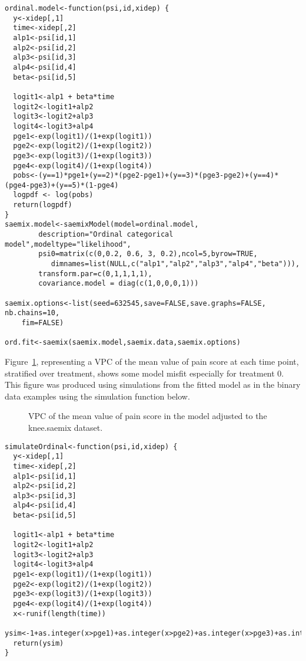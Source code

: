 \begin{verbatim}
ordinal.model<-function(psi,id,xidep) {
  y<-xidep[,1]
  time<-xidep[,2]
  alp1<-psi[id,1]
  alp2<-psi[id,2]
  alp3<-psi[id,3]
  alp4<-psi[id,4]
  beta<-psi[id,5]
  
  logit1<-alp1 + beta*time
  logit2<-logit1+alp2
  logit3<-logit2+alp3
  logit4<-logit3+alp4
  pge1<-exp(logit1)/(1+exp(logit1))
  pge2<-exp(logit2)/(1+exp(logit2))
  pge3<-exp(logit3)/(1+exp(logit3))
  pge4<-exp(logit4)/(1+exp(logit4))
  pobs<-(y==1)*pge1+(y==2)*(pge2-pge1)+(y==3)*(pge3-pge2)+(y==4)*(pge4-pge3)+(y==5)*(1-pge4)
  logpdf <- log(pobs)  
  return(logpdf)
}  
saemix.model<-saemixModel(model=ordinal.model,
        description="Ordinal categorical model",modeltype="likelihood",
        psi0=matrix(c(0,0.2, 0.6, 3, 0.2),ncol=5,byrow=TRUE,
           dimnames=list(NULL,c("alp1","alp2","alp3","alp4","beta"))),
        transform.par=c(0,1,1,1,1),
        covariance.model = diag(c(1,0,0,0,1)))

saemix.options<-list(seed=632545,save=FALSE,save.graphs=FALSE, nb.chains=10, 
    fim=FALSE)

ord.fit<-saemix(saemix.model,saemix.data,saemix.options)
\end{verbatim}

Figure~\ref{fig:kneeMedScoreVPC}, representing a VPC of the mean value of pain score at each time point, stratified over treatment, shows some model misfit especially for treatment 0. This figure was produced using simulations from the fitted model as in the binary data examples using the simulation function below.
\begin{figure}[!h]
\begin{center}
\end{center}
\par \kern -0.5cm
\caption{VPC of the mean value of pain score in the model adjusted to the {\sf knee.saemix} dataset.} \label{fig:kneeMedScoreVPC}
\end{figure}

\begin{verbatim}
simulateOrdinal<-function(psi,id,xidep) {
  y<-xidep[,1]
  time<-xidep[,2]
  alp1<-psi[id,1]
  alp2<-psi[id,2]
  alp3<-psi[id,3]
  alp4<-psi[id,4]
  beta<-psi[id,5]
  
  logit1<-alp1 + beta*time
  logit2<-logit1+alp2
  logit3<-logit2+alp3
  logit4<-logit3+alp4
  pge1<-exp(logit1)/(1+exp(logit1))
  pge2<-exp(logit2)/(1+exp(logit2))
  pge3<-exp(logit3)/(1+exp(logit3))
  pge4<-exp(logit4)/(1+exp(logit4))
  x<-runif(length(time))
  ysim<-1+as.integer(x>pge1)+as.integer(x>pge2)+as.integer(x>pge3)+as.integer(x>pge4)
  return(ysim)
}
\end{verbatim}


